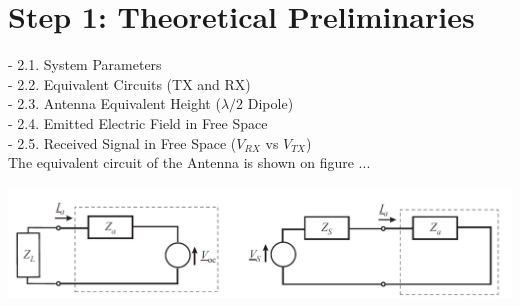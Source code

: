 \setcounter{secnumdepth}{2}

\chapter{Step 1: Theoretical Preliminaries}
- 2.1. System Parameters\\
- 2.2. Equivalent Circuits (TX and RX)\\
- 2.3. Antenna Equivalent Height ($\lambda/2$ Dipole)\\
- 2.4. Emitted Electric Field in Free Space\\
- 2.5. Received Signal in Free Space ($V_{RX}$ vs $V_{TX}$)\\

The equivalent circuit of the Antenna is shown on figure ...

\begin{center}
	\includegraphics[width=0.7\linewidth]{Pictures/eq_circuit}
\end{center}

